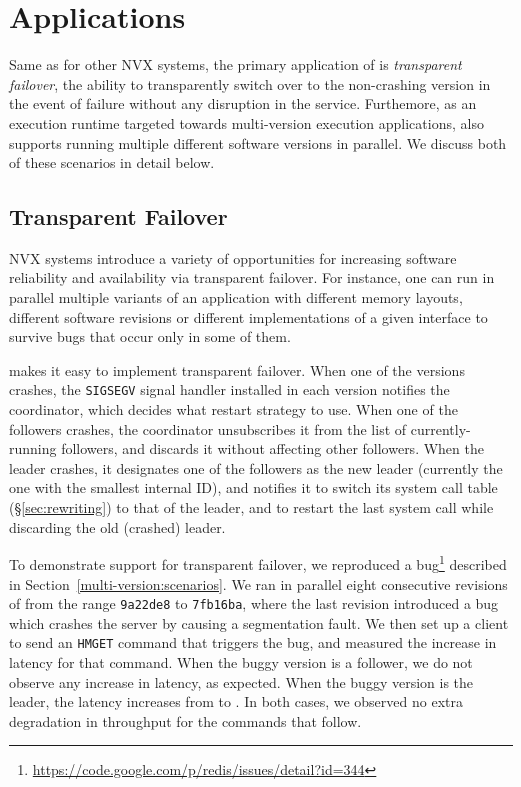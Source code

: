 \section{Applications}
\label{sec:applications}

Same as for other NVX systems, the primary application of \varan is
\emph{transparent failover}, \ie the ability to transparently switch over to
the non-crashing version in the event of failure without any disruption in the
service. Furthemore, as an execution runtime targeted towards multi-version
execution applications, \varan also supports running multiple different
software versions in parallel.  We discuss both of these scenarios in detail
below.

\subsection{Transparent Failover}
\label{sec:failover}


NVX systems introduce a variety of opportunities for increasing
software reliability and availability via transparent failover.  For
instance, one can run in parallel multiple variants of an application with
different memory layouts, different software revisions or different
implementations of a given interface to survive bugs that occur 
only in some of them.   

\varan makes it easy to implement transparent failover.  When one of the
versions crashes, the \lstinline`SIGSEGV` signal handler installed in each
version notifies the coordinator, which decides what restart strategy
to use.  When one of the followers crashes, the coordinator unsubscribes it
from the list of currently-running followers, and discards it without
affecting other followers.  When the leader crashes, it designates one
of the followers as the new leader (currently the one with the
smallest internal ID), and notifies it to switch its system call table
(\S\ref{sec:rewriting}) to that of the leader, and to restart the last
system call while discarding the old (crashed) leader.

To demonstrate support for transparent failover, we reproduced a
\redis
bug\footnote{\url{https://code.google.com/p/redis/issues/detail?id=344}}
described in Section~\ref{multi-version:scenarios}.  We ran in
parallel eight consecutive revisions of \redis from the range
\lstinline`9a22de8` to \lstinline`7fb16ba`, where the last revision
introduced a bug which crashes the server by causing a segmentation
fault. We then set up a client to send an \lstinline`HMGET` command
that triggers the bug, and measured the increase in latency for that
command.  When the buggy version is a follower, we do not observe any
increase in latency, as expected.  When the buggy version is the leader,
the latency increases from \redisnormallatency to
\redisfailoverlatency.  In both cases, we observed no extra
degradation in throughput for the commands that follow.

